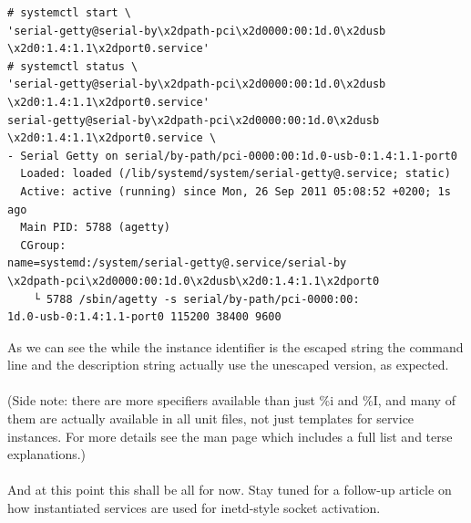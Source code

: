 \documentclass[titlepage]{article}
\begin{document}
\begin{lstlisting}
# systemctl start \
'serial-getty@serial-by\x2dpath-pci\x2d0000:00:1d.0\x2dusb
\x2d0:1.4:1.1\x2dport0.service'
# systemctl status \
'serial-getty@serial-by\x2dpath-pci\x2d0000:00:1d.0\x2dusb
\x2d0:1.4:1.1\x2dport0.service'
serial-getty@serial-by\x2dpath-pci\x2d0000:00:1d.0\x2dusb
\x2d0:1.4:1.1\x2dport0.service \
- Serial Getty on serial/by-path/pci-0000:00:1d.0-usb-0:1.4:1.1-port0
  Loaded: loaded (/lib/systemd/system/serial-getty@.service; static)
  Active: active (running) since Mon, 26 Sep 2011 05:08:52 +0200; 1s ago
  Main PID: 5788 (agetty)
  CGroup: 
name=systemd:/system/serial-getty@.service/serial-by
\x2dpath-pci\x2d0000:00:1d.0\x2dusb\x2d0:1.4:1.1\x2dport0
    └ 5788 /sbin/agetty -s serial/by-path/pci-0000:00:
1d.0-usb-0:1.4:1.1-port0 115200 38400 9600
\end{lstlisting}
As we can see the while the instance identifier is the escaped string the command line and the description string actually use the unescaped version, as expected.
\\
\\
(Side note: there are more specifiers available than just \%i and \%I, and many of them are actually available in all unit files, not just templates for service instances. For more details see the man page which includes a full list and terse explanations.)
\\
\\
And at this point this shall be all for now. Stay tuned for a follow-up article on how instantiated services are used for inetd-style socket activation.
\end{document}
